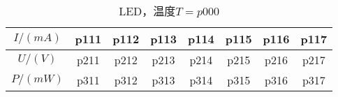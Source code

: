 \newpage
\begin{table}[H]
    \centering
    \begin{tabular}{|c|c|c|c|c|c|c|c|}
        \hline
        $I/(\si{mA})$ & p111 & p112 & p113 & p114 & p115 & p116 & p117 \\\hline
        $U / (\si{V})$  & p211 & p212 & p213 & p214 & p215 & p216 & p217 \\\hline
        $P / (\si{mW})$ & p311 & p312 & p313 & p314 & p315 & p316 & p317 \\\hline
    \end{tabular}
    \caption{LED，温度$T=p000$}
\end{table}
